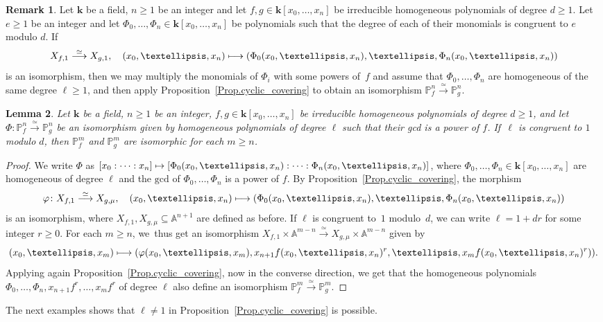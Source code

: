 \documentclass[11pt]{article}
\newcommand\mto{\mathchoice{\longmapsto}{\mapsto}{\mapsto}{\mapsto}}
\newtheorem{lemma}{Lemma}[section]
\theoremstyle{definition}
\newtheorem{remark}[lemma]{Remark}
\newcommand\iso{\stackrel{\simeq}{\longrightarrow}}
\newcommand\A{{\mathbb A}}\let\AA\A
\renewcommand\k{{\mathbf k}}
\newcommand\p{{\mathbb P}}\let\PP\p
\newcommand{\kk}{\mathbf{k}}
\begin{document}
\begin{remark}\label{remark:Replacemodulo}
Let $\kk$ be a field, $n \geq 1$ be an integer and let $f,g\in \k[x_0,\ldots,x_n]$ be irreducible homogeneous polynomials of degree $d \ge 1$. Let $e \ge 1$ be an integer and let $\Phi_0,\ldots,\Phi_n\in \k[x_0,\ldots,x_n]$ be polynomials such that the degree of each of their monomials is congruent to $e$ modulo $d$. If
\[
X_{f, 1} \iso X_{g, 1}, \quad (x_0,\ldots,x_n)\mto (\Phi_0(x_0,\ldots,x_n),\ldots, \Phi_n(x_0,\ldots,x_n))
\]
is an isomorphism, then we may multiply the monomials of $\Phi_i$ with some powers of~$f$ and assume that $\Phi_0,\ldots,\Phi_n$ are homogeneous of the same degree $\ell \geq 1$, and then apply Proposition~\ref{Prop.cyclic_covering} to obtain an isomorphism $\p^n_f\iso \p^n_g$.
\end{remark}

\begin{lemma} \label{lemma:Replace_n_by_m}
Let $\kk$ be a field, $n \geq 1$ be an integer, $f,g\in \k[x_0,\ldots,x_n]$ be irreducible homogeneous polynomials of degree $d \ge 1$, and let $\Phi\colon \p^n_f \iso \p^n_g$ be an isomorphism given by homogeneous polynomials of degree $\ell$ such that their gcd is a power of $f$.
If~$\ell$ is congruent to $1$ modulo $d$, then $\p^{m}_f$ and $\p^{m}_g$ are isomorphic for each $m\ge n$.
\end{lemma}

\begin{proof}
We write $\Phi$ as $[x_0:\cdots:x_n] \mto [\Phi_0(x_0,\ldots,x_n):\cdots: \Phi_n(x_0,\ldots,x_n)]$, where $\Phi_0,\ldots,\Phi_n\in \k[x_0,\ldots,x_n]$ are homogeneous of degree $\ell$ and the $\mathrm{gcd}$ of $\Phi_0,\ldots,\Phi_ n$ is a power of $f$. By Proposition~\ref{Prop.cyclic_covering}, the morphism
\[
\varphi\colon X_{f,1} \iso X_{g,\mu}, \quad (x_0,\ldots,x_n) \mto (\Phi_0(x_0,\ldots,x_n),\ldots, \Phi_n(x_0,\ldots,x_n))
\]
is an isomorphism, where $X_{f,1}, X_{g,\mu}\subseteq \A^{n+1}$ are defined as before. If $\ell$ is congruent to~$1$ modulo~$d$, we can write $\ell=1+dr$ for some integer $r\ge 0$. For each $m\ge n$,
we~thus get an isomorphism
$X_{f,1}\times \A^{m-n}\iso X_{g,\mu}\times \A^{m-n}$ given by
\[
(x_0,\ldots,x_m) \mto (\varphi(x_0,\ldots,x_m), x_{n+1}f(x_0,\ldots,x_n)^r,\ldots, x_m f(x_0,\ldots,x_n)^r)).
\]
Applying again Proposition~\ref{Prop.cyclic_covering}, now in the converse direction, we get that the homogeneous polynomials $\Phi_0,\ldots,\Phi_n, x_{n+1} f^r,\ldots,x_m f^r$ of degree $\ell$ also define an isomorphism $\p^{m}_f\iso\p^{m}_g$.
\end{proof}
The next examples shows that $\ell\neq 1$ in Proposition~\ref{Prop.cyclic_covering}
is possible.
\end{document}
